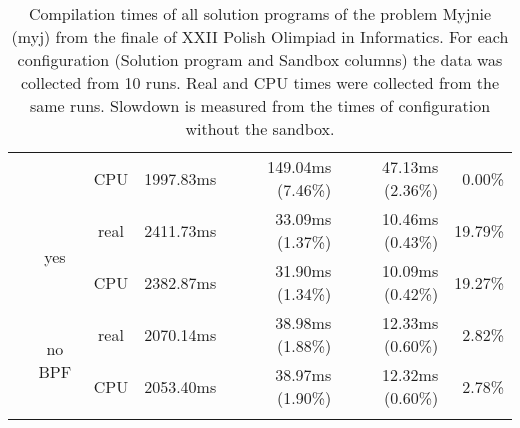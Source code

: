 \documentclass[en]{pracamgr}
\begin{document}
\begin{appendices}
\begin{small}
\begin{longtable}{|l|c|c|r|r|r|r|}
                            &                         & CPU  & 1997.83ms & 149.04ms (7.46\%) & 47.13ms (2.36\%) & 0.00\% \\*
                            \cline{2-7}
                            & \multirow{2}{*}{yes}    & real & 2411.73ms & 33.09ms (1.37\%) & 10.46ms (0.43\%) & 19.79\% \\*
                            &                         & CPU  & 2382.87ms & 31.90ms (1.34\%) & 10.09ms (0.42\%) & 19.27\% \\*
                            \cline{2-7}
                            & \multirow{2}{*}{no BPF} & real & 2070.14ms & 38.98ms (1.88\%) & 12.33ms (0.60\%) & 2.82\% \\*
                            &                         & CPU  & 2053.40ms & 38.97ms (1.90\%) & 12.32ms (0.60\%) & 2.78\% \\
\hline
\caption{Compilation times of all solution programs of the problem Myjnie (myj) from the finale of XXII Polish Olimpiad in Informatics. For each configuration (Solution program and Sandbox columns) the data was collected from 10 runs. Real and CPU times were collected from the same runs. Slowdown is measured from the times of configuration without the sandbox.}
\label{table:myj_compilation}
\end{longtable}
\end{small}


\end{appendices}
\end{document}
